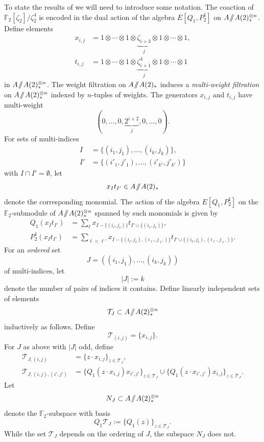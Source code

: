 \documentclass[10pt]{amsart}
\newcommand{\sslash}{\mathbin{/\mkern-6mu/}}
\newcommand{\mmod}{\! \sslash \!}
\newcommand{\mc}[1]{\mathcal{#1}}
\newcommand{\abs}[1]{\lvert #1 \rvert}
\newcommand{\FF}{\mathbb{F}}
\theoremstyle{definition}
\numberwithin{equation}{section}
\numberwithin{figure}{section}
\begin{document}
To state the results of \cite{BBT} we will need to introduce some notation.
The coaction of $\FF_2[\zeta_2]/\zeta_2^4$ is encoded in the dual action of the algebra $E[Q_1, P_2^1]$ on $A\mmod A(2)^{\otimes n}_*$.
Define elements
\begin{align*}
x_{i,j} & = 1\otimes  \cdots \otimes 1 \otimes \underbrace{\zeta_{i+3}}_{j} \otimes 1 \otimes \cdots \otimes 1,  \\
t_{i,j} & = 1\otimes \cdots \otimes 1 \otimes \underbrace{\zeta^{4}_{i+1}}_{j} \otimes 1 \otimes \cdots \otimes 1
\end{align*}
in $A\mmod A(2)_*^{\otimes n}$.  
The weight filtration on $A \mmod A(2)_*$ induces a \emph{multi-weight filtration} on $A \mmod A(2)^{\otimes n}_*$ indexed by $n$-tuples of weights.
The generators $x_{i,j}$ and $t_{i,j}$ have multi-weight
$$ (0, \ldots ,0, \underbrace{2^{i+2}}_{j}, 0, \ldots, 0). $$
For sets of multi-indices
\begin{align*} 
I & = \{ (i_1, j_1), \ldots, (i_k, j_k) \}, \\
I' & = \{ (i'_1, j'_1), \ldots, (i'_{k'}, j'_{k'}) \}
\end{align*}
with $I \cap I' = \emptyset$,
let 
$$ x_I t_{I'} \in A\mmod A(2)_* $$
denote the corresponding monomial. 
The action of the algebra $E[Q_1, P_2^1]$ on the $\FF_2$-submodule of $A\mmod A(2)_*^{\otimes n}$ spanned by such monomials is given by
\begin{align*}
Q_1(x_{I}t_{I'}) & = \sum_\ell x_{I-\{(i_\ell, j_\ell)\}} t_{I' \cup \{(i_\ell, j_\ell)\}}, \\
P_2^1(x_I t_{I'}) & = \sum_{\ell < \ell'} x_{I-\{(i_\ell,j_\ell),(i_{\ell'}, j_{\ell'})\}} t_{I' \cup \{(i_\ell,j_\ell),(i_{\ell'}, j_{\ell'})\}}. 
\end{align*}
For an \emph{ordered} set 
$$ J = ((i_1, j_1), \ldots, (i_k, j_k)) $$  
of multi-indices, let
$$ \abs{J} := k $$
denote the number of pairs of indices it contains.
Define linearly independent sets of elements
$$ \mc{T}_J \subset A \mmod A(2)^{\otimes n}_* $$
inductively as follows.  Define
$$ \mc{T}_{(i,j)} = \{x_{i,j}\}. $$
For $J$ as above with $\abs{J}$ odd, define
\begin{align*}
\mc{T}_{J, (i,j)} & = \{ z \cdot x_{i,j} \}_{z \in \mc{T}_J}, \\
\mc{T}_{J, (i,j), (i',j')} & = \{ Q_1(z \cdot x_{i,j})x_{i',j'} \}_{z \in \mc{T}_J} \cup \{ Q_1(z \cdot x_{i',j'})x_{i,j} \}_{z \in \mc{T}_J}.
\end{align*} 
Let 
$$ N_J \subset A\mmod A(2)_*^{\otimes n} $$ 
denote the $\FF_2$-subspace with basis
$$ Q_1 \mc{T}_J := \{ Q_1(z) \}_{z \in \mc{T}_J}. $$
While the set $\mc{T}_J$ depends on the ordering of $J$, the subspace $N_J$ does not.
\end{document}
